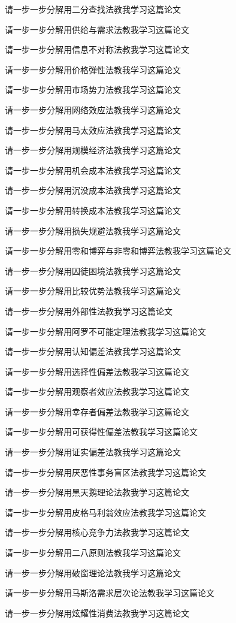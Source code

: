 \documentclass[12pt]{book}
\begin{document}
请一步一步分解用二分查找法教我学习这篇论文

请一步一步分解用供给与需求法教我学习这篇论文


请一步一步分解用信息不对称法教我学习这篇论文

请一步一步分解用价格弹性法教我学习这篇论文


请一步一步分解用市场势力法教我学习这篇论文


请一步一步分解用网络效应法教我学习这篇论文


请一步一步分解用马太效应法教我学习这篇论文


请一步一步分解用规模经济法教我学习这篇论文


请一步一步分解用机会成本法教我学习这篇论文


请一步一步分解用沉没成本法教我学习这篇论文


请一步一步分解用转换成本法教我学习这篇论文

请一步一步分解用损失规避法教我学习这篇论文


请一步一步分解用零和博弈与非零和博弈法教我学习这篇论文


请一步一步分解用囚徒困境法教我学习这篇论文


请一步一步分解用比较优势法教我学习这篇论文


请一步一步分解用外部性法教我学习这篇论文

请一步一步分解用阿罗不可能定理法教我学习这篇论文


请一步一步分解用认知偏差法教我学习这篇论文

请一步一步分解用选择性偏差法教我学习这篇论文


请一步一步分解用观察者效应法教我学习这篇论文


请一步一步分解用幸存者偏差法教我学习这篇论文


请一步一步分解用可获得性偏差法教我学习这篇论文


请一步一步分解用证实偏差法教我学习这篇论文


请一步一步分解用厌恶性事务盲区法教我学习这篇论文

请一步一步分解用黑天鹅理论法教我学习这篇论文


请一步一步分解用皮格马利翁效应法教我学习这篇论文


请一步一步分解用核心竞争力法教我学习这篇论文

请一步一步分解用二八原则法教我学习这篇论文

请一步一步分解用破窗理论法教我学习这篇论文


请一步一步分解用马斯洛需求层次论法教我学习这篇论文


请一步一步分解用炫耀性消费法教我学习这篇论文
\end{document}
